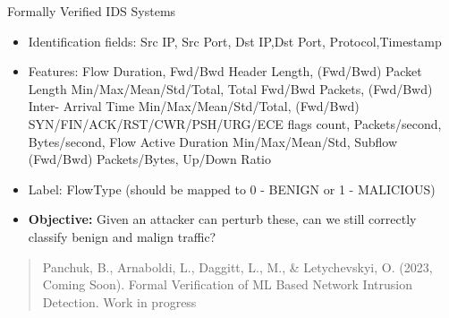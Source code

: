 \documentclass[t,compress,aspectratio=169]{beamer}
\begin{document}
\begin{frame}[fragile]{Formally Verified IDS Systems}
    \begin{itemize}
        \item Identification fields: Src IP, Src Port, Dst IP,Dst Port, Protocol,Timestamp
        \item Features: Flow Duration, Fwd/Bwd Header Length, (Fwd/Bwd) Packet Length Min/Max/Mean/Std/Total, Total Fwd/Bwd Packets, (Fwd/Bwd) Inter- Arrival Time Min/Max/Mean/Std/Total, (Fwd/Bwd) SYN/FIN/ACK/RST/CWR/PSH/URG/ECE flags count, Packets/second, Bytes/second, Flow Active Duration Min/Max/Mean/Std, Subflow (Fwd/Bwd) Packets/Bytes, Up/Down Ratio
        \item Label: FlowType (should be mapped to 0 - BENIGN or 1 - MALICIOUS)
         \item \textbf{\textcolor{aisecred}{Objective:}} Given an attacker can perturb these, can we still correctly classify benign and malign traffic?

    \end{itemize}



	\begin{quote}
		\tiny Panchuk, B., {Arnaboldi, L.}, Daggitt, L., M., \& Letychevskyi, O. (2023, Coming Soon). Formal Verification of ML Based Network Intrusion Detection. Work in progress

	\end{quote}


\end{frame}



\end{document}
